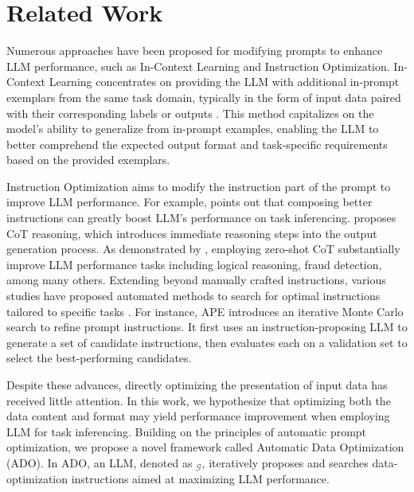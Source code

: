 \section{Related Work}
\label{sec:related}
Numerous approaches have been proposed for modifying prompts to enhance LLM performance, such as In-Context Learning and Instruction Optimization. In-Context Learning concentrates on providing the LLM with additional in-prompt exemplars from the same task domain, typically in the form of input data paired with their corresponding labels or outputs \cite{wei2023larger, dong2022survey, shin2022effect}. This method capitalizes on the model's ability to generalize from in-prompt examples, enabling the LLM to better comprehend the expected output format and task-specific requirements based on the provided exemplars. 

Instruction Optimization aims to modify the instruction part of the prompt to improve LLM performance. For example, \citet{si2022prompting} points out that composing better instructions can greatly boost LLM's performance on task inferencing. \citet{wei2022chain} proposes CoT reasoning, which introduces immediate reasoning steps into the output generation process. As demonstrated by \cite{wei2022chain}, employing zero-shot CoT substantially improve LLM performance tasks including logical reasoning, fraud detection, among many others. Extending beyond manually crafted instructions, various studies have proposed automated methods to search for optimal instructions tailored to specific tasks \cite{zhou2023large, pryzant2023automatic, yang2024large}. For instance, APE \cite{zhou2023large} introduces an iterative Monte Carlo search to refine prompt instructions. It first uses an instruction-proposing LLM to generate a set of candidate instructions, then evaluates each on a validation set to select the best-performing candidates.

Despite these advances, directly optimizing the presentation of input data has received little attention. In this work, we hypothesize that optimizing both the data content and format may yield performance improvement when employing LLM for task inferencing. Building on the principles of automatic prompt optimization, we propose a novel framework called Automatic Data Optimization (ADO). In ADO, an LLM, denoted as $_{\mathcal{G}}$, iteratively proposes and searches data-optimization instructions aimed at maximizing LLM performance.


